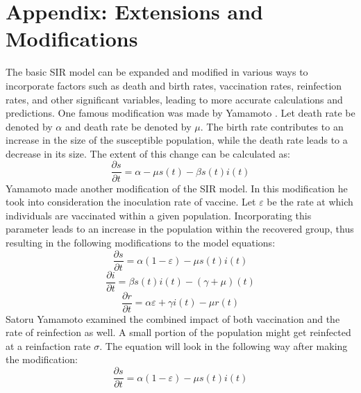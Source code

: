 \section{Appendix: Extensions and Modifications}\label{appendix-a}\thispagestyle{SectionFirstPage} %
\setcounter{figure}{0}
\setcounter{table}{0}
\hspace{\parindent}The basic SIR model can be expanded and modified in various ways to incorporate factors such as death and birth rates, vaccination rates, reinfection rates, and other significant variables, leading to more accurate calculations and predictions.
One famous modification was made by Yamamoto \cite{Saturo_Yamamoto}.
Let death rate be denoted by $\alpha$ and death rate be denoted by $\mu$.
The birth rate contributes to an increase in the size of the susceptible population, while the death rate leads to a decrease in its size.
The extent of this change can be calculated as:
\begin{equation*}
    \frac{\partial s}{\partial t} = \alpha - \mu s(t) - \beta s(t)i(t)
\end{equation*}
\hspace{\parindent}Yamamoto made another modification of the SIR model.
In this modification he took into consideration the inoculation rate of vaccine.
Let $\varepsilon$ be the rate at which individuals are vaccinated within a given population.
Incorporating this parameter leads to an increase in the population within the recovered group, thus resulting in the following modifications to the model equations:
\begin{equation*}
    \frac{\partial s}{\partial t} = \alpha(1 - \varepsilon) - \mu s(t)i(t)
\end{equation*}
\begin{equation*}
    \frac{\partial i}{\partial t} = \beta s(t)i(t) - (\gamma + \mu)(t)
\end{equation*}
\begin{equation*}
    \frac{\partial r}{\partial t} = \alpha\varepsilon + \gamma i(t) - \mu r(t)
\end{equation*}
\hspace{\parindent}Satoru Yamamoto examined the combined impact of both vaccination and the rate of reinfection as well.
A small portion of the population might get reinfected at a reinfaction rate $\sigma$.
The equation will look in the following way after making the modification:
\begin{equation*}
    \frac{\partial s}{\partial t} = \alpha(1 - \varepsilon) - \mu s(t)i(t)
\end{equation*}
